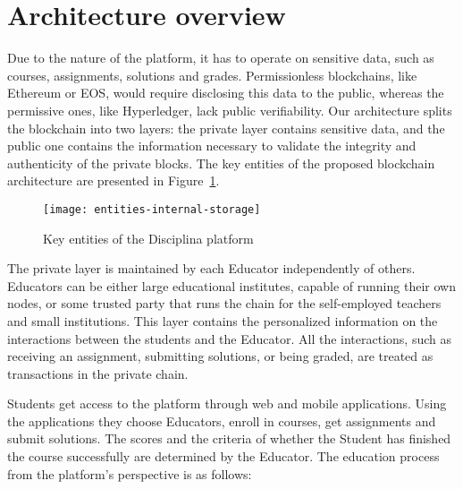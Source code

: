 \section{Architecture overview}
\label{sec:architecture}

Due to the nature of the platform, it has to operate on sensitive data, such as
courses, assignments, solutions and grades. Permissionless blockchains, like
Ethereum or EOS, would require disclosing this data to the public, whereas the
permissive ones, like Hyperledger, lack public verifiability. Our architecture
splits the blockchain into two layers: the private layer contains sensitive
data, and the public one contains the information necessary to validate the
integrity and authenticity of the private blocks. The key entities of the
proposed blockchain architecture are presented in Figure~\ref{fig:entities}.

\begin{figure}[ht]
\centering
\texttt{[image: entities-internal-storage]}
\caption{Key entities of the Disciplina platform}
\label{fig:entities}
\end{figure}

The private layer is maintained by each Educator independently of others.
Educators can be either large educational institutes, capable of running their
own nodes, or some trusted party that runs the chain for the self-employed
teachers and small institutions. This layer contains the personalized
information on the interactions between the students and the Educator. All the
interactions, such as receiving an assignment, submitting solutions, or being
graded, are treated as transactions in the private chain.


Students get access to the platform through web and mobile applications. Using
the applications they choose Educators, enroll in courses, get assignments and
submit solutions. The scores and the criteria of whether the Student has
finished the course successfully are determined by the Educator. The education
process from the platform’s perspective is as follows:

